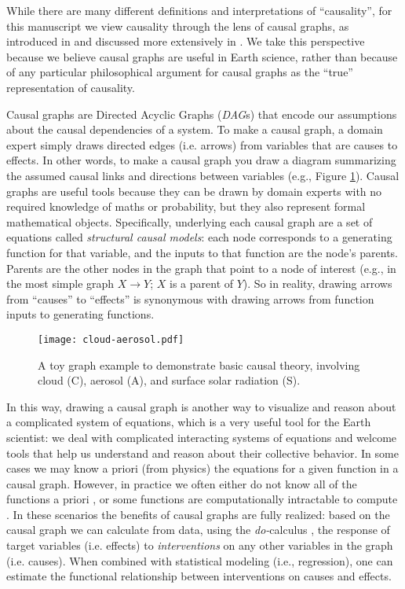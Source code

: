 \documentclass[12pt]{article}
\begin{document}
While there are many different definitions and interpretations of
``causality'', for this manuscript we view causality through the lens
of causal graphs, as introduced in \citet{pearl1995causal} and
discussed more extensively in \citet{pearl2009causality}. We take this
perspective because we believe causal graphs are useful in Earth
science, rather than because of any particular philosophical argument
for causal graphs as the ``true'' representation of causality.

Causal graphs are Directed Acyclic Graphs (\emph{DAG}s) that encode
our assumptions about the causal dependencies of a system. To make a
causal graph, a domain expert simply draws directed edges
(i.e. arrows) from variables that are causes to effects. In other
words, to make a causal graph you draw a diagram summarizing the
assumed causal links and directions between variables (e.g., Figure
\ref{fig:toy}). Causal graphs are useful tools because they can be
drawn by domain experts with no required knowledge of maths or
probability, but they also represent formal mathematical
objects. Specifically, underlying each causal graph are a set of
equations called \emph{structural causal models}: each node
corresponds to a generating function for that variable, and the inputs
to that function are the node's parents. Parents are the other nodes
in the graph that point to a node of interest (e.g., in the most
simple graph $X \to Y$; $X$ is a parent of $Y$). So in reality,
drawing arrows from ``causes'' to ``effects'' is synonymous with
drawing arrows from function inputs to generating functions.

\begin{figure} \texttt{[image: cloud-aerosol.pdf]}
  \caption{A toy graph example to demonstrate basic causal theory,
    involving cloud (C), aerosol (A), and surface solar radiation
    (S).}
  \label{fig:toy}
\end{figure}

In this way, drawing a causal graph is another way to visualize and
reason about a complicated system of equations, which is a very useful
tool for the Earth scientist: we deal with complicated interacting
systems of equations and welcome tools that help us understand and
reason about their collective behavior. In some cases we may know a
priori (from physics) the equations for a given function in a causal
graph. However, in practice we often either do not know all of the
functions a priori \citep[e.g., plant stomata response to
VPD;][]{massmann2019, zhou2019arid, zhou2019feedback, grossiord2020},
or some functions are computationally intractable to compute
\citep[e.g., turbulence, moist convection, and cloud microphysics in
large scale models;][]{zadra2018,gentine2018}. In these scenarios the
benefits of causal graphs are fully realized: based on the causal
graph we can calculate from data, using the \textit{do-}calculus
\citep{pearl-1994-do-calculus}, the response of target variables
(i.e. effects) to \textit{interventions} on any other variables in the
graph (i.e. causes). When combined with statistical modeling (i.e.,
regression), one can estimate the functional relationship between
interventions on causes and effects.
\end{document}

